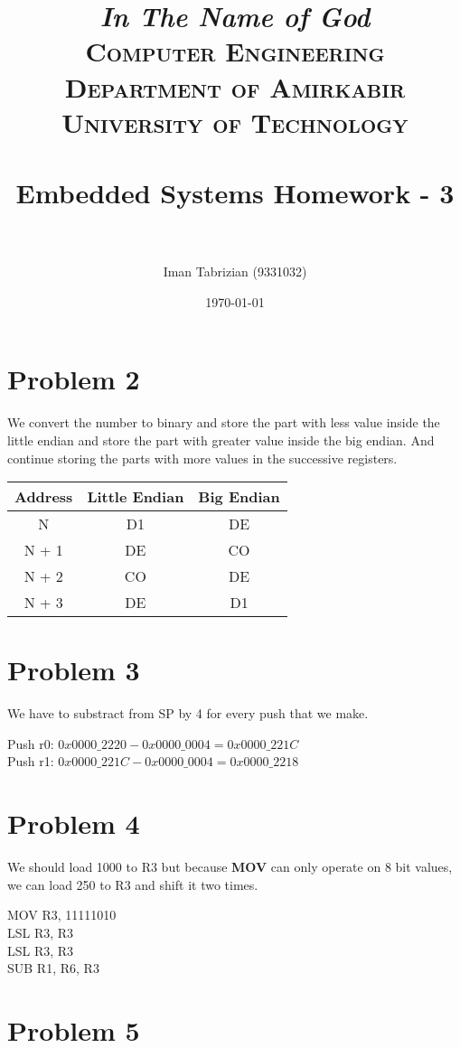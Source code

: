 \documentclass[paper=a4, fontsize=11pt]{scrartcl} %
\title{
\normalfont \normalsize
\textit{In The Name of God} \\
\textsc{Computer Engineering Department of Amirkabir University of Technology} \\ [25pt]
\horrule{0.5pt} \\[0.4cm] %
\huge Embedded Systems Homework - 3 \\ %
\horrule{2pt} \\[0.5cm] %
}
\author{Iman Tabrizian (9331032)}
\date{\normalsize\today}
\numberwithin{equation}{section} %
\numberwithin{figure}{section} %
\numberwithin{table}{section} %
\begin{document}
\maketitle


\section{Problem 2}

We convert the number to binary and store the part with less value inside
the little endian and store the part with greater value inside the big endian.
And continue storing the parts with more values in the successive registers.

\begin{tabular}{|c|c|c|}
    \hline
    Address & Little Endian & Big Endian \\ \hline
    N & D1 & DE \\ \hline
    N + 1 & DE & CO \\ \hline
    N + 2 & CO & DE \\ \hline
    N + 3 & DE & D1 \\ \hline
\end{tabular}

\section{Problem 3}

We have to substract from SP by 4 for every push that we make.

Push r0: $0x0000\_2220 - 0x0000\_0004 = 0x0000\_221C$ \\

Push r1: $0x0000\_221C - 0x0000\_0004 =0x0000\_2218 $ \\

\section{Problem 4}

We should load 1000 to R3 but because \textbf{MOV} can only operate on
8 bit values, we can load 250 to R3 and shift it two times.

MOV R3, 11111010 \\
LSL R3, R3 \\
LSL R3, R3 \\
SUB R1, R6, R3 \\

\section{Problem 5}
\end{document}
